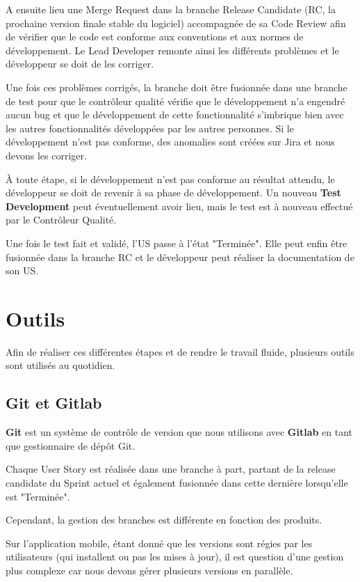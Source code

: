 \documentclass{article}
\begin{document}
A ensuite lieu une Merge Request dans la branche Release Candidate (RC, la prochaine version finale stable du logiciel) accompagnée de sa Code Review afin de vérifier que le code est conforme aux conventions et aux normes de développement. Le Lead Developer remonte ainsi les différents problèmes et le développeur se doit de les corriger.

Une fois ces problèmes corrigés, la branche doit être fusionnée dans une branche de test pour que le contrôleur qualité vérifie que le développement n'a engendré aucun bug et que le développement de cette fonctionnalité s'imbrique bien avec les autres fonctionnalités développées par les autres personnes. Si le développement n'est pas conforme, des anomalies sont créées sur Jira et nous devons les corriger.

À toute étape, si le développement n'est pas conforme au résultat attendu, le développeur se doit de revenir à sa phase de développement. Un nouveau \textbf{Test Development} peut éventuellement avoir lieu, mais le test est à nouveau effectué par le Contrôleur Qualité.

Une fois le test fait et validé, l'US passe à l'état "Terminée". Elle peut enfin être fusionnée dans la branche RC et le développeur peut réaliser la documentation de son US.

\newpage

\section{Outils}

Afin de réaliser ces différentes étapes et de rendre le travail fluide, plusieurs outils sont utilisés au quotidien.

\subsection{Git et Gitlab}

\textbf{Git} est un système de contrôle de version que nous utilisons avec \textbf{Gitlab} en tant que gestionnaire de dépôt Git.

Chaque User Story est réalisée dans une branche à part, partant de la release candidate du Sprint actuel et également fusionnée dans cette dernière lorsqu'elle est "Terminée".

Cependant, la gestion des branches est différente en fonction des produits.

Sur l'application mobile, étant donné que les versions sont régies par les utilisateurs (qui installent ou pas les mises à jour), il est question d'une gestion plus complexe car nous devons gérer plusieurs versions en parallèle.
\end{document}
